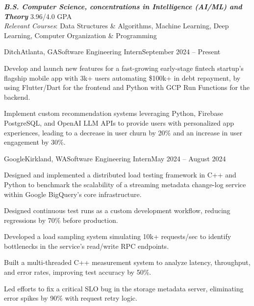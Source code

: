 \documentclass{article}
\begin{document}
\thispagestyle{empty}


\begin{flushleft}


{\textbf{\textit{B.S. Computer Science, concentrations in Intelligence (AI/ML) and Theory}} \hfill 3.96/4.0 GPA \\ \textit{Relevant Courses}:
    Data Structures \& Algorithms,
    Machine Learning,
    Deep Learning,
    Computer Organization \& Programming
    \\
}


    \begin{experience}{Ditch}{Atlanta, GA}{Software Engineering Intern}{September 2024 -- Present}
        \item Develop and launch new features for a fast-growing early-stage fintech startup's flagship mobile app with 3k+ users automating \$100k+ in debt repayment, by using Flutter/Dart for the frontend and Python with GCP Run Functions for the backend.
        \item Implement custom recommendation systems leveraging Python, Firebase PostgreSQL, and OpenAI LLM APIs to provide users with personalized app experiences, leading to a decrease in user churn by 20\% and an increase in user engagement by 30\%.
    \end{experience}

    \begin{experience}{Google}{Kirkland, WA}{Software Engineering Intern}{May 2024 -- August 2024}
        \item Designed and implemented a distributed load testing framework in C++ and Python to benchmark the scalability of a streaming metadata change-log service within Google BigQuery's core infrastructure.
        \item Designed continuous test runs as a custom development workflow, reducing regressions by 70\% before production.
        \item Developed a load sampling system simulating 10k+ requests/sec to identify bottlenecks in the service's read/write RPC endpoints.
        \item Built a multi-threaded C++ measurement system to analyze latency, throughput, and error rates, improving test accuracy by 50\%.
        \item Led efforts to fix a critical SLO bug in the storage metadata server, eliminating error spikes by 90\% with request retry logic.
    \end{experience}


\end{flushleft}
\end{document}

